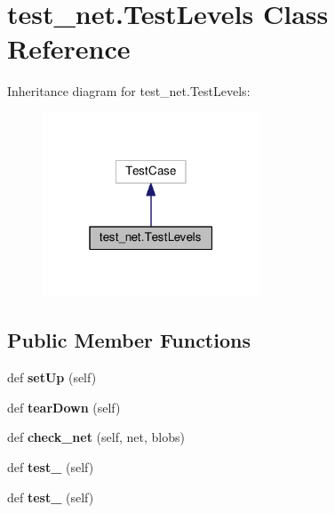 \hypertarget{classtest__net_1_1_test_levels}{}\section{test\+\_\+net.\+Test\+Levels Class Reference}
\label{classtest__net_1_1_test_levels}


Inheritance diagram for test\+\_\+net.\+Test\+Levels\+:
\nopagebreak
\begin{figure}[H]
\begin{center}
\leavevmode
\includegraphics[width=183pt]{classtest__net_1_1_test_levels__inherit__graph}
\end{center}
\end{figure}
\subsection*{Public Member Functions}
\begin{DoxyCompactItemize}
\item 
\mbox{\label{classtest__net_1_1_test_levels_a59713893abfea157d59f66aaa5eb2ea7}} 
def {\bfseries set\+Up} (self)
\item 
\mbox{\label{classtest__net_1_1_test_levels_af21192fb70847bc30e6b03f9ab772289}} 
def {\bfseries tear\+Down} (self)
\item 
\mbox{\label{classtest__net_1_1_test_levels_a99e79766399717c8415c6f2713b46d57}} 
def {\bfseries check\+\_\+net} (self, net, blobs)
\item 
\mbox{\label{classtest__net_1_1_test_levels_ab850f45dc80cf32feab0e98a755cc91d}} 
def {\bfseries test\+\_} (self)
\item 
\mbox{\label{classtest__net_1_1_test_levels_af51aa7bf230b9a760ec780398d03dc85}} 
def {\bfseries test\+\_} (self)
\end{DoxyCompactItemize}
